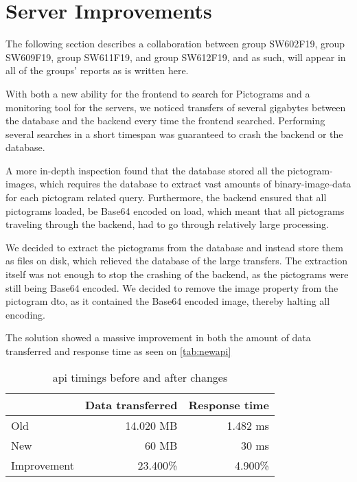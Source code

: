 \section{Server Improvements}

The following section describes a collaboration between group SW602F19, group SW609F19, group SW611F19, and group SW612F19, and as such, will appear in all of the groups' reports as is written here.

With both a new ability for the frontend to search for Pictograms and a monitoring tool for the servers, we noticed transfers of several gigabytes between the database and the backend every time the frontend searched. Performing several searches in a short timespan was guaranteed to crash the backend or the database.

A more in-depth inspection found that the database stored all the pictogram-images, which requires the database to extract vast amounts of binary-image-data for each pictogram related query. Furthermore, the backend ensured that all pictograms loaded, be Base64 encoded on load, which meant that all pictograms traveling through the backend, had to go through relatively large processing.

We decided to extract the pictograms from the database and instead store them as files on disk, which relieved the database of the large transfers. The extraction itself was not enough to stop the crashing of the backend, as the pictograms were still being Base64 encoded. We decided to remove the image property from the pictogram \gls{dto}, as it contained the Base64 encoded image, thereby halting all encoding.

The solution showed a massive improvement in both the amount of data transferred and response time as seen on \autoref{tab:newapi}

\begin{table}[H]
    \centering
    \begin{tabular}{|l|r|r|}
    \hline
                    & Data transferred  & Response time \\ \hline
        Old         & 14.020 MB         & 1.482 ms      \\ \hline 
        New         & 60 MB             & 30 ms         \\ \hline
        Improvement & 23.400\%          & 4.900\%       \\ \hline
    \end{tabular}
    \caption{\gls{api} timings before and after changes}
    \label{tab:newapi}
\end{table}


